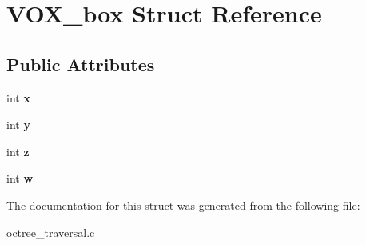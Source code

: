 \hypertarget{structVOX__box}{\section{V\-O\-X\-\_\-box Struct Reference}
\label{structVOX__box}
}
\subsection*{Public Attributes}
\begin{DoxyCompactItemize}
\item 
\hypertarget{structVOX__box_a62b9c5e02d0aadabadfdbf8f1a6853bf}{int {\bfseries x}}\label{structVOX__box_a62b9c5e02d0aadabadfdbf8f1a6853bf}

\item 
\hypertarget{structVOX__box_a35a53b6f801351dbec62790480f64ec6}{int {\bfseries y}}\label{structVOX__box_a35a53b6f801351dbec62790480f64ec6}

\item 
\hypertarget{structVOX__box_a156aa910b14fb6d51f4fd837dd497e68}{int {\bfseries z}}\label{structVOX__box_a156aa910b14fb6d51f4fd837dd497e68}

\item 
\hypertarget{structVOX__box_afc14e61cc56609047294f12b00d22a58}{int {\bfseries w}}\label{structVOX__box_afc14e61cc56609047294f12b00d22a58}

\end{DoxyCompactItemize}


The documentation for this struct was generated from the following file\-:\begin{DoxyCompactItemize}
\item 
octree\-\_\-traversal.\-c\end{DoxyCompactItemize}
